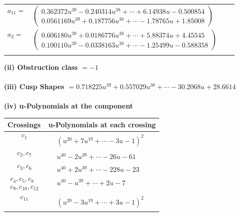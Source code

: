 \documentclass[1p]{elsarticle_modified}
\theoremstyle{definition}
\begin{document}
\begin{tabular}{m{7pt} m{180pt} m{7pt} m{180pt} }
\flushright $a_{11}=$&$\begin{pmatrix}0.362372 u^{39}-0.240314 u^{38}+\cdots+6.14938 u-0.500854\\0.0561169 u^{39}+0.187756 u^{38}+\cdots-1.78765 u+1.85008\end{pmatrix}$ \\
\flushright $a_{2}=$&$\begin{pmatrix}0.606180 u^{39}+0.0186776 u^{38}+\cdots+5.88374 u+4.45545\\0.100110 u^{39}-0.0338163 u^{38}+\cdots-1.25499 u-0.588358\end{pmatrix}$\\&\end{tabular}
\flushleft \textbf{(ii) Obstruction class $= -1$}\\~\\
\flushleft \textbf{(iii) Cusp Shapes $= 0.718225 u^{39}+0.557029 u^{38}+\cdots-30.2068 u+28.6614$}\\~\\
\newpage\renewcommand{\arraystretch}{1}
\flushleft \textbf{(iv) u-Polynomials at the component}\newline \\
\begin{tabular}{m{50pt}|m{274pt}}
Crossings & \hspace{64pt}u-Polynomials at each crossing \\
\hline $$\begin{aligned}c_{1}\end{aligned}$$&$\begin{aligned}
&(u^{20}+7 u^{19}+\cdots-3 u-1)^{2}
\end{aligned}$\\
\hline $$\begin{aligned}c_{2},c_{7}\end{aligned}$$&$\begin{aligned}
&u^{40}-2 u^{39}+\cdots-26 u-61
\end{aligned}$\\
\hline $$\begin{aligned}c_{3},c_{6}\end{aligned}$$&$\begin{aligned}
&u^{40}+2 u^{39}+\cdots-228 u-23
\end{aligned}$\\
\hline $$\begin{aligned}c_{4},c_{5},c_{8}\\c_{9},c_{10},c_{12}\end{aligned}$$&$\begin{aligned}
&u^{40}- u^{39}+\cdots+2 u-7
\end{aligned}$\\
\hline $$\begin{aligned}c_{11}\end{aligned}$$&$\begin{aligned}
&(u^{20}-3 u^{19}+\cdots+3 u-1)^{2}
\end{aligned}$\\
\hline
\end{tabular}\\~\\
\end{document}
